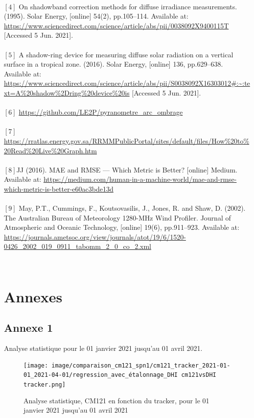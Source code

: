 \documentclass[12pt,a4paper]{article}
\begin{document}
\begin{flushleft}
‌~\\
$[4]$ On shadowband correction methods for diffuse irradiance measurements. (1995). Solar Energy, [online] 54(2), pp.105–114. Available at: \url{https://www.sciencedirect.com/science/article/abs/pii/0038092X9400115T} [Accessed 5 Jun. 2021].\\

‌~\\
$[5]$ A shadow-ring device for measuring diffuse solar radiation on a vertical surface in a tropical zone. (2016). Solar Energy, [online] 136, pp.629–638. Available at: \url{https://www.sciencedirect.com/science/article/abs/pii/S0038092X16303012#:~:text=A\%20shadow\%2Dring\%20device\%20is} [Accessed 5 Jun. 2021].\\
‌~\\
$[6]$ \url{https://github.com/LE2P/pyranometre\_arc\_ombrage} \\
~\\
$[7]$ \url{https://rratlas.energy.gov.sa/RRMMPublicPortal/sites/default/files/How\%20to\%20Read\%20Live\%20Graph.htm} \\
~\\
$[8]$JJ (2016). MAE and RMSE — Which Metric is Better? [online] Medium. Available at: \href{https://medium.com/human-in-a-machine-world/mae-and-rmse-which-metric-is-better-e60ac3bde13d}{https://medium.com/human-in-a-machine-world/mae-and-rmse-which-metric-is-better-e60ac3bde13d}\\
~\\
$[9]$ May, P.T., Cummings, F., Koutsovasilis, J., Jones, R. and Shaw, D. (2002). The Australian Bureau of Meteorology 1280-MHz Wind Profiler. Journal of Atmospheric and Oceanic Technology, [online] 19(6), pp.911–923. Available at: \url{https://journals.ametsoc.org/view/journals/atot/19/6/1520-0426_2002_019_0911_tabomm_2_0_co_2.xml}

\newpage

‌\section{Annexes}
\subsection*{Annexe 1}
Analyse statistique pour le 01 janvier 2021 jusqu'au 01 avril 2021.

\begin{figure}[H]
\centering
\texttt{[image: image/comparaison\_cm121\_spn1/cm121\_tracker\_2021-01-01\_2021-04-01/regression\_avec\_étalonnage\_DHI cm121vsDHI tracker.png]} 
\caption{Analyse statistique, CM121 en fonction du tracker, pour le 01 janvier 2021 jusqu'au 01 avril 2021}    
\end{figure}


\end{flushleft}
\end{document}
